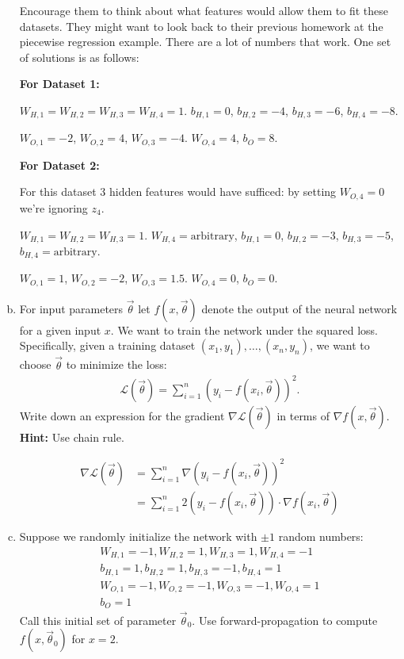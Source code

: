 \documentclass[10pt]{article}
\begin{document}
\begin{enumerate}[(a)]
	\color{blue}
	Encourage them to think about what features would allow them to fit these datasets. They might want to look back to their previous homework at the piecewise regression example. There are a lot of numbers that work. One set of solutions is as follows:
	
	\textbf{For Dataset 1:} 
	
	$W_{H,1} = W_{H,2} = W_{H,3} = W_{H,4} = 1$. $b_{H,1} = 0$, $b_{H,2} = -4$, $b_{H,3} = -6$, $b_{H,4} = -8$.
	
	$W_{O,1} = -2$, $W_{O,2} = 4$, $W_{O,3} = -4$. $W_{O,4} = 4$, $b_{O} = 8$.
	
\textbf{For Dataset 2:} 

For this dataset 3 hidden features would have sufficed: by setting $W_{O,4} = 0$ we're ignoring $z_4$. 

$W_{H,1} = W_{H,2} = W_{H,3} = 1$. $W_{H,4} = \text{arbitrary}$, $b_{H,1} = 0$, $b_{H,2} = -3$, $b_{H,3} = -5$, $b_{H,4} = \text{arbitrary}$.

$W_{O,1} = 1$, $W_{O,2} = -2$, $W_{O,3} = 1.5$. $W_{O,4} = 0$, $b_{O} = 0$.
	
	\color{black}
	
	\item For input parameters $\vec{\theta}$ let $f(x,\vec{\theta})$ denote the output of the neural network for a given input $x$. We want to train the network under the squared loss. Specifically, given a training dataset $(x_1,y_1),\ldots, (x_n,y_n)$, we want to choose $\vec{\theta}$ to minimize the loss:
	\begin{align*}
	\mathcal{L}(\vec{\theta}) = \sum_{i=1}^n (y_i - f(x_i,\vec{\theta}))^2.
	\end{align*}
	Write down an expression for the gradient $\nabla \mathcal{L}(\vec{\theta})$ in terms of $\nabla f(x,\vec{\theta})$. \textbf{Hint:} Use chain rule.
	
	\color{blue}
	\begin{align*}
		\nabla \mathcal{L}(\vec{\theta}) &= \sum_{i=1}^n \nabla(y_i - f(x_i,\vec{\theta}))^2 \\
		 &= \sum_{i=1}^n  2(y_i - f(x_i,\vec{\theta}))\cdot \nabla f(x_i,\vec{\theta})
	\end{align*}
	\color{black}
	
	
	\item Suppose we randomly initialize the network with $\pm 1$ random numbers:
	\begin{align*}
	W_{H,1} = -1, W_{H,2} = 1 , W_{H,3} = 1, W_{H,4} = -1\\
	b_{H,1} = 1, b_{H,2} = 1,b_{H,3} = -1,b_{H,4} = 1 \\
	W_{O,1} = -1, W_{O,2} = -1 , W_{O,3} = -1, W_{O,4} = 1\\
	b_O = 1
	\end{align*}
	Call this initial set of parameter $\vec{\theta}_0$. Use forward-propagation to compute $ f(x,\vec{\theta}_0)$ for $x = 2$. 
	

\end{enumerate}
\end{document}
